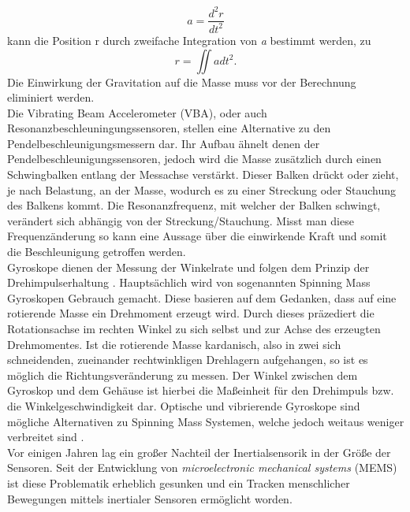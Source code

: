 \begin{equation}\label{beschl}
  a = \frac{d^2r}{dt^2}
\end{equation}
kann die Position r durch zweifache Integration von \textit{a} bestimmt werden, zu
\begin{equation}\label{pos}
  r = \iint{a dt^2}.
\end{equation}
Die Einwirkung der Gravitation auf die Masse muss vor der Berechnung eliminiert werden. \cite{P24}
\\Die Vibrating Beam Accelerometer (VBA), oder auch Resonanzbeschleuningungssensoren, stellen eine Alternative zu den Pendelbeschleunigungsmessern dar. Ihr Aufbau ähnelt denen der Pendelbeschleunigungssensoren, jedoch wird die Masse zusätzlich durch einen Schwingbalken entlang der Messachse verstärkt. Dieser Balken drückt oder zieht, je nach Belastung, an der Masse, wodurch es zu einer Streckung oder Stauchung des Balkens kommt.
Die Resonanzfrequenz, mit welcher der Balken schwingt, verändert sich abhängig von der Streckung/Stauchung. Misst man diese Frequenzänderung so kann eine Aussage über die einwirkende Kraft und somit die Beschleunigung getroffen werden. \cite{P32}
\\Gyroskope dienen der Messung der Winkelrate \cite{P32} und folgen dem Prinzip der Drehimpulserhaltung \cite{P24}. Hauptsächlich wird von sogenannten Spinning Mass Gyroskopen Gebrauch gemacht. Diese basieren auf dem Gedanken, dass auf eine rotierende Masse ein Drehmoment erzeugt wird. Durch dieses präzediert die Rotationsachse im rechten Winkel zu sich selbst und zur Achse des erzeugten Drehmomentes. Ist die rotierende Masse kardanisch, also in zwei sich schneidenden, zueinander rechtwinkligen Drehlagern aufgehangen, so ist es möglich die Richtungsveränderung zu messen. Der Winkel zwischen dem Gyroskop und dem Gehäuse ist hierbei die Maßeinheit für den Drehimpuls bzw. die Winkelgeschwindigkeit dar. \cite{P24}
Optische und vibrierende Gyroskope sind mögliche Alternativen zu Spinning Mass Systemen, welche jedoch weitaus weniger verbreitet sind \cite{P32}.
\\Vor einigen Jahren lag ein großer Nachteil der Inertialsensorik in der Größe der Sensoren. Seit der Entwicklung von \textit{microelectronic mechanical systems} (MEMS) ist diese Problematik erheblich gesunken und ein Tracken menschlicher Bewegungen mittels inertialer Sensoren ermöglicht worden. \cite{P31}
